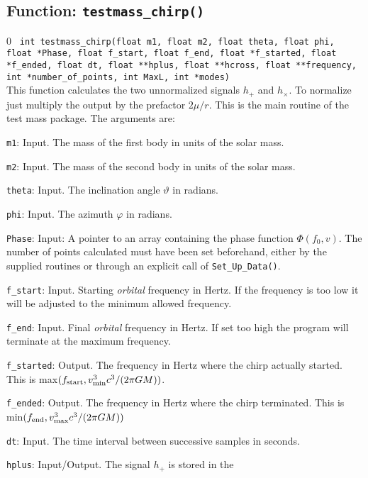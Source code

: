 \subsection{Function: {\tt testmass\_chirp()}}
\setcounter{equation}0
{\tt 
int testmass\_chirp(float m1, float m2, float theta, float phi,
               float *Phase, float f\_start, float f\_end, float *f\_started,
               float *f\_ended,  float dt, float **hplus, float **hcross, 
	       float **frequency, int *number\_of\_points, int MaxL, int *modes)}\\
This function calculates the two unnormalized signals $h_+$ and
$h_\times$. To normalize just multiply the output
by the prefactor $2 \mu/r$. This is the main routine of the test mass package.
The arguments are:
\begin{description}
\item{{\tt m1}}: Input.  The mass of the first body in units of the solar mass.
\item{{\tt m2}}: Input.  The mass of the second body in units of the solar mass.
\item{{\tt theta}}: Input. The inclination angle $\vartheta$ in radians.
\item{{\tt phi}}: Input. The azimuth  $\varphi$ in radians.
\item{{\tt Phase}}: Input: A pointer to an array containing the
           phase function $\Phi(f_0,v)$. The number of points calculated 
		   must have been set beforehand, either by the supplied routines or
		   through an explicit call of {\tt Set\_Up\_Data()}.  
\item{{\tt f\_start}}: Input. Starting {\em orbital} frequency in Hertz.
       If the frequency is too low it will be adjusted to the minimum allowed
	   frequency.
\item{{\tt f\_end}}: Input. Final {\em orbital} frequency in Hertz. 
       If set too high the program will terminate at the maximum 
	   frequency.
\item{{\tt f\_started}}: Output. The frequency in Hertz where the chirp actually
                   started. This is max$(f_{\rm start}, v_{\rm min}^3 c^3/(2 \pi G M))$.
\item{{\tt f\_ended}}: Output. The frequency in Hertz where the chirp terminated.
               This is min$(f_{\rm end}, v_{\rm max}^3 c^3/(2 \pi G M))$
\item{{\tt dt}}: Input. The time interval between successive samples in
seconds.
\item{{\tt hplus}}: Input/Output. The signal $h_+$ is stored in the

\end{description}
